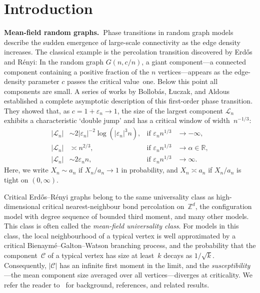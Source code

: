 \documentclass[a4paper, a4wide, 10pt, reqno]{amsart}
\theoremstyle{plain}
\theoremstyle{definition}
\numberwithin{equation}{section}
\newcommand{\R}{{\mathbb R}}
\newcommand{\Z}{{\mathbb Z}}
\newcommand{\sC}{{\mathscr C}}
\newcommand{\sL}{{\mathscr L}}
\begin{document}
\section{Introduction}
\noindent\textbf{Mean-field random graphs.\ }Phase transitions in random graph models describe the sudden emergence of large-scale connectivity as the edge density increases.  
The classical example is the percolation transition discovered by Erd\H{o}s and R\'enyi: In the random graph $G(n,c/n)$, a giant component---a connected component containing a positive fraction of the $n$ vertices---appears as the edge-density parameter $c$ passes the critical value~one.  
Below this point all components are small.  
A series of works by Bollob\'as, \L{}uczak, and Aldous~\cite{Aldous, B84, ER60, JKLP, L90} established a complete asymptotic description of this first-order phase transition.  
They showed that, as $c=1+\varepsilon_n\to1$,
the size of the largest component $\sL_n$ exhibits a characteristic `double jump' 
and has a critical window of width~$n^{-1/3}$:
\begin{align}
    |\sL_n|&\sim  2|\varepsilon_n|^{-2}\log(|\varepsilon_n|^3n), &\text{if }\varepsilon_nn^{1/3}&\to-\infty, \nonumber\\
    |\sL_n|&\asymp n^{2/3},&\text{if }\varepsilon_n n^{1/3}&\to\alpha\in\R,\label{eq:critical-er}\\
    |\sL_n|&\sim 2\varepsilon_n n,&\text{if }\varepsilon_nn^{1/3} &\to \infty.\nonumber
\end{align}
Here, we write $X_n\sim a_n$ if $X_n/a_n\to1$ in probability, and $X_n\asymp a_n$ if $X_n/a_n$ is tight on $(0,\infty)$. 
\smallskip

Critical Erd\H{o}s--R\'enyi graphs belong to the same universality class as high-dimensional critical nearest-neighbour bond percolation on~$\Z^d$, the configuration model with degree sequence of bounded third moment, and many other models. This class is often called the \emph{mean-field universality class}.  
For models in this class, the local neighbourhood of a typical vertex is well approximated by a critical Bienaym\'e--Galton--Watson branching process, and the probability that the component~$\sC$ of a typical vertex has size at least~$k$ decays as $1/\sqrt{k}$.  
Consequently, $|\sC|$ has an infinite first moment in the limit, and the \emph{susceptibility}---the mean component size averaged over all vertices---diverges at criticality.  
We refer the reader to~\cite{Bollobas, Heydenreich, JLR} for background, references, and related results. 
\end{document}
